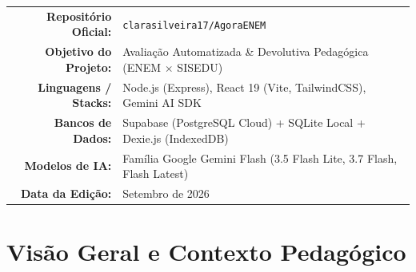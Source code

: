 \documentclass[11pt,a4paper]{article}
\begin{document}
\begin{titlepage}
    \begin{center}
        \begin{tabularx}{\textwidth}{r X}
            \textbf{Repositório Oficial:} & \texttt{clarasilveira17/AgoraENEM} \\
            \textbf{Objetivo do Projeto:} & Avaliação Automatizada \& Devolutiva Pedagógica (ENEM $\times$ SISEDU) \\
            \textbf{Linguagens / Stacks:} & Node.js (Express), React 19 (Vite, TailwindCSS), Gemini AI SDK \\
            \textbf{Bancos de Dados:} & Supabase (PostgreSQL Cloud) + SQLite Local + Dexie.js (IndexedDB) \\
            \textbf{Modelos de IA:} & Família Google Gemini Flash (3.5 Flash Lite, 3.7 Flash, Flash Latest) \\
            \textbf{Data da Edição:} & Setembro de 2026 \\
        \end{tabularx}
    \end{center}

    \vfill

    \begin{center}
    \end{center}

    \vspace{0.5cm}
\end{titlepage}

\tableofcontents
\newpage
{}

\section{Visão Geral e Contexto Pedagógico}
\end{document}
